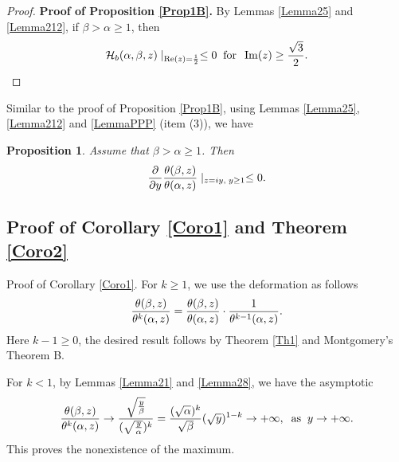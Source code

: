 \documentclass[reqno,english]{amsart}
\newtheorem{proposition}{Proposition}[section]
\newtheorem{open problem}{Open Problem}[section]
\newtheorem{open question}{Open Question}[section]
\newtheorem{open questions on hexagonal lattice}{Open Questions on hexagonal lattice}[section]
\renewcommand{\Re}{\operatorname{Re}}
\renewcommand{\Im}{\operatorname{Im}}
\begin{document}
\begin{proof}{\bf Proof of Proposition \ref{Prop1B}.}
By Lemmas \ref{Lemma25} and \ref{Lemma212}, if $\beta>\alpha\geq1$, then
\begin{equation}\aligned\nonumber
\mathcal{H}_b(\alpha,\beta,z)\mid_{\Re(z)=\frac{1}{2}}\leq0\;\;\hbox{for}\;\;\Im(z)\geq\frac{\sqrt3}{2}.
\endaligned\end{equation}
\end{proof}





Similar to the proof of Proposition \ref{Prop1B}, using Lemmas \ref{Lemma25}, \ref{Lemma212} and \ref{LemmaPPP} (item (3)), we have

\begin{proposition}\label{Prop1C} Assume that $\beta>\alpha\geq1$. Then
\begin{equation}\aligned\nonumber
\frac{\partial}{\partial y}\frac{\theta(\beta,z)}{\theta(\alpha,z)}\mid_{z=iy, \;y\geq1}\leq0.
\endaligned\end{equation}

\end{proposition}


\subsection{Proof of Corollary \ref{Coro1} and Theorem \ref{Coro2}}


Proof of Corollary \ref{Coro1}.
For $k\geq1$, we use the deformation as follows
\begin{equation}\aligned\nonumber
\frac{\theta(\beta,z)}{\theta^k(\alpha,z)}=\frac{\theta(\beta,z)}{\theta(\alpha,z)}\cdot
\frac{1}{\theta^{k-1}(\alpha,z)}.
\endaligned\end{equation}
Here $k-1\geq0$, the desired result follows by Theorem \ref{Th1} and Montgomery's Theorem B.

For $k<1$, by Lemmas \ref{Lemma21} and \ref{Lemma28}, we have the asymptotic
\begin{equation}\aligned\nonumber
\frac{\theta(\beta,z)}{\theta^k(\alpha,z)}\rightarrow\frac{\sqrt{\frac{y}{\beta}}}{(\sqrt{\frac{y}{\alpha}})^k}
=\frac{(\sqrt\alpha)^k}{\sqrt\beta}(\sqrt y)^{1-k}\rightarrow+\infty,\;\;\hbox{as}\;\; y\rightarrow+\infty.
\endaligned\end{equation}
This proves the nonexistence of the maximum.
\end{document}
